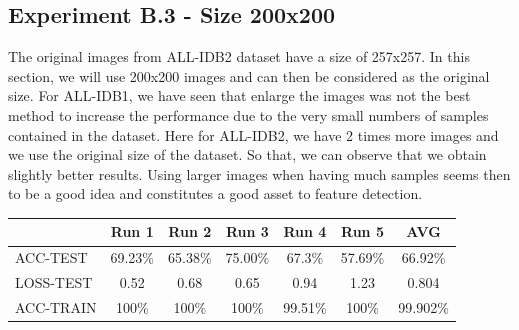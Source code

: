 \documentclass[11pt, openany]{report}
\theoremstyle{plain}
\theoremstyle{definition}
\theoremstyle{remark}
\begin{document}
\newpage
\subsection{Experiment B.3 - Size 200x200}
The original images from ALL-IDB2 dataset have a size of 257x257. In this section, we will use 200x200 images and can then be considered as the original size. For ALL-IDB1, we have seen that enlarge the images was not the best method to increase the performance due to the very small numbers of samples contained in the dataset. Here for ALL-IDB2, we have 2 times more images and we use the original size of the dataset. So that, we can observe that we obtain slightly better results. Using larger images when having much samples seems then to be a good idea and constitutes a good asset to feature detection.    


\begin{center}
\begin{tabular}{|l|c|c|c|c|c|c|}
  \hline
   & \textbf{Run 1} & \textbf{Run 2} & \textbf{Run 3} & \textbf{Run 4} & \textbf{Run 5} & \textbf{AVG}\\
  \hline
  ACC-TEST & 69.23\% & 65.38\% & 75.00\% & 67.3\% & 57.69\% & 66.92\%\\
  LOSS-TEST & 0.52 & 0.68 & 0.65 & 0.94  & 1.23 & 0.804 \\ 
  ACC-TRAIN & 100\% & 100\% & 100\% & 99.51\% & 100\% & 99.902\% \\ 
  \hline
\end{tabular}
\label{table:results-B3}
\end{center}
\end{document}
